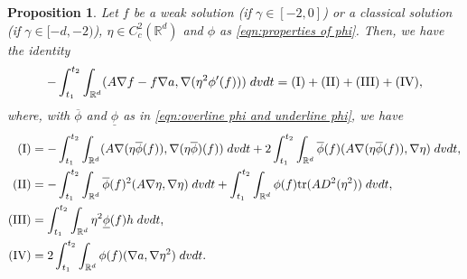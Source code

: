 \documentclass[12pt,american]{amsart}
\numberwithin{equation}{section}
\theoremstyle{plain}
\newtheorem{prop}[thm]{Proposition}
\theoremstyle{definition}                  %
\def\tr{\textnormal{tr}}
\begin{document}
  \begin{prop}\label{prop:basic energy inequality}
    Let $f$ be a weak solution (if $\gamma\in [-2,0]$) or a classical solution (if $\gamma \in [-d,-2)$), $\eta \in C^2_c(\mathbb{R}^d)$ and $\phi$ as \eqref{eqn:properties of phi}. Then, we have the identity
    \begin{align*}
      -\int_{t_1}^{t_2}\int_{\mathbb{R}^d}(A\nabla f-f\nabla a,\nabla (\eta^2\phi'(f)))\;dvdt = (\textnormal{I})+(\textnormal{II})+(\textnormal{III})+(\textnormal{IV}),
    \end{align*}
    where, with $\overline{\phi}$ and $\underline{\phi}$ as in \eqref{eqn:overline phi and underline phi}, we have
    \begin{align*}
      (\textnormal{I}) & = -\int_{t_1}^{t_2}\int_{\mathbb{R}^d}(A\nabla (\eta \overline{\phi}(f)),\nabla (\eta \overline{\phi})(f))\;dvdt+2\int_{t_1}^{t_2}\int_{\mathbb{R}^d}\overline{\phi}(f)(A\nabla (\eta \overline{\phi}(f)),\nabla \eta)\;dvdt,\\
      (\textnormal{II}) & = -\int_{t_1}^{t_2}\int_{\mathbb{R}^d}\overline{\phi}(f)^2(A\nabla \eta,\nabla \eta)\;dvdt+\int_{t_1}^{t_2}\int_{\mathbb{R}^d}\phi(f)\tr(AD^2(\eta^2))\;dvdt,\\
      (\textnormal{III}) & = \int_{t_1}^{t_2}\int_{\mathbb{R}^d} \eta^2\underline{\phi}(f) h\;dvdt,\\
      (\textnormal{IV}) & = 2\int_{t_1}^{t_2}\int_{\mathbb{R}^d}\phi(f)(\nabla a,\nabla \eta^2)\;dvdt.	
    \end{align*}
  
  \end{prop}
\end{document}
